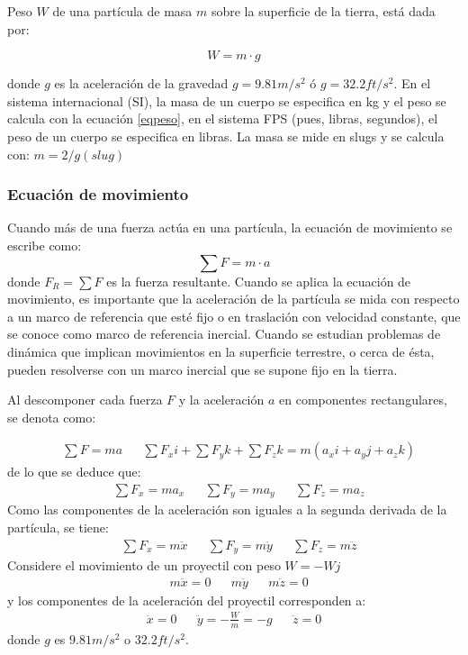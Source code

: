 Peso $W$ de una partícula de masa $m$ sobre la superficie de la tierra, está dada por: 

\begin{equation}
    W=m\cdot g
    \label{eqpeso}
\end{equation}

donde $g$ es la aceleración de la gravedad $g=9.81m/s^2$ ó $g=32.2ft/s^2$.
En el sistema internacional (SI), la masa de un cuerpo se especifica en kg y el peso se calcula con la ecuación
\eqref{eqpeso}, en el sistema FPS (pues, libras, segundos), el peso de un cuerpo se especifica en libras. La masa se 
mide en slugs y se calcula con: $m=2/g(slug)$

\subsubsection{Ecuación de movimiento}
Cuando más de una fuerza actúa en una partícula, la ecuación de movimiento se escribe como: 
\begin{equation}
    \sum F=m\cdot a
\end{equation}
donde $F_R=\sum F$ es la fuerza resultante.
Cuando se aplica la ecuación de movimiento, es importante que la aceleración de la partícula se mida con respecto a un marco de referencia que esté fijo o en traslación 
con velocidad constante, que se conoce como marco de referencia inercial. Cuando se estudian problemas de dinámica que implican movimientos en la superficie terrestre, o cerca de ésta, pueden resolverse con un marco inercial que se supone fijo en la tierra.

Al descomponer cada fuerza $F$ y la aceleración $a$ en componentes rectangulares, se denota como: 

\begin{align*}
    &\sum F=ma&& \sum F_xi+\sum F_yk+\sum F_zk=m\left(a_xi+a_yj+a_zk\right)
\end{align*}
de lo que se deduce que: 
\begin{align*}
    &\sum F_x=ma_x&&\sum F_y=ma_y&&\sum F_z=ma_z
\end{align*}
Como las componentes de la aceleración son iguales a la segunda derivada de la partícula, se tiene:
\begin{align*}
    &\sum F_x=m\ddot{x}&&\sum F_y=m\ddot{y}&&\sum F_z=m\ddot{z}
\end{align*}
Considere el movimiento de un proyectil con peso $W=-Wj$
\begin{align*}
    &m\ddot{x}=0&&m\ddot{y}&&m\ddot{z}=0
\end{align*}
y los componentes de la aceleración del proyectil corresponden a: 
\begin{align*}
    \ddot{x}=0&&\ddot{y}=-\frac{W}{m}=-g&&\ddot{z}=0
\end{align*}
donde $g$ es $9.81 m/s^2$ o $32.2 ft/s^2$.

